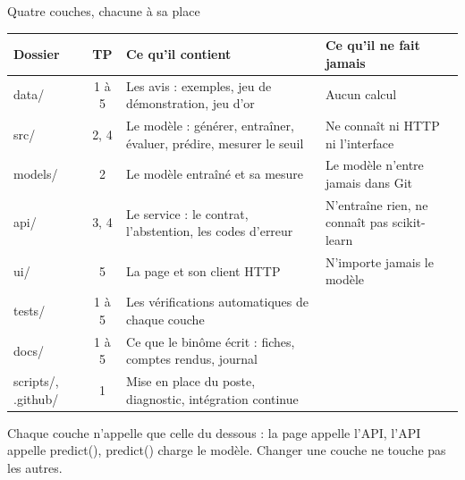 \documentclass[aspectratio=169,11pt]{beamer}
\newcommand{\co}[1]{{\ttfamily\hyphenchar\font=45\relax #1}}
\renewcommand{\arraystretch}{1.2}
\begin{document}
\begin{frame}{Quatre couches, chacune à sa place}
\tiny\renewcommand{\arraystretch}{1.15}
\begin{tabularx}{\textwidth}{@{}l c >{\raggedright\arraybackslash}X >{\raggedright\arraybackslash}p{4.2cm}@{}}
\toprule
\textbf{Dossier} & \textbf{TP} & \textbf{Ce qu'il contient} & \textbf{Ce qu'il ne fait jamais} \\
\midrule
\co{data/} & 1 à 5 & Les avis : exemples, jeu de démonstration, jeu d'or & Aucun calcul \\
\co{src/} & 2, 4 & Le modèle : générer, entraîner, évaluer, prédire, mesurer le seuil & Ne connaît ni HTTP ni l'interface \\
\co{models/} & 2 & Le modèle entraîné et sa mesure & Le modèle n'entre jamais dans Git \\
\co{api/} & 3, 4 & Le service : le contrat, l'abstention, les codes d'erreur & N'entraîne rien, ne connaît pas scikit-learn \\
\co{ui/} & 5 & La page et son client HTTP & N'importe jamais le modèle \\
\midrule
\co{tests/} & 1 à 5 & Les vérifications automatiques de chaque couche & \\
\co{docs/} & 1 à 5 & Ce que le binôme écrit : fiches, comptes rendus, journal & \\
\co{scripts/}, \co{.github/} & 1 & Mise en place du poste, diagnostic, intégration continue & \\
\bottomrule
\end{tabularx}

\medskip
\scriptsize Chaque couche n'appelle que celle du dessous : la page appelle l'API, l'API appelle \co{predict()},
\co{predict()} charge le modèle. Changer une couche ne touche pas les autres.
\end{frame}
\end{document}
